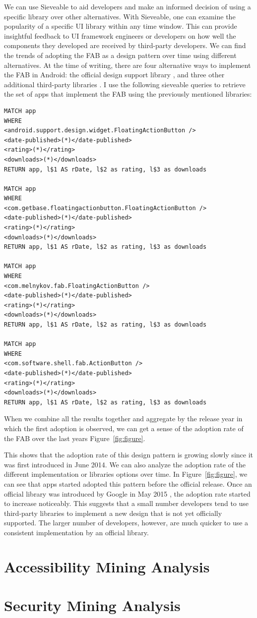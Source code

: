 We can use Sieveable to aid developers and make an informed decision of using a specific library over other alternatives.
With Sieveable, one can examine the popularity of a specific UI library within any time window.
This can provide insightful feedback to UI framework engineers or developers on how well the components they developed are received by third-party developers.
We can find the trends of adopting the FAB as a design pattern over time using different alternatives.
At the time of writing, there are four alternative ways to implement the FAB in Android: the official design support library \cite{Android_Design_Support_Lib}, and three other additional third-party libraries \cite{android-floating-action-button, FloatingActionButton, fab}.
I use the following sieveable queries to retrieve the set of apps that implement the FAB using the previously mentioned libraries: 

\begin{verbatim}
MATCH app
WHERE
<android.support.design.widget.FloatingActionButton />
<date-published>(*)</date-published>
<rating>(*)</rating>
<downloads>(*)</downloads>
RETURN app, l$1 AS rDate, l$2 as rating, l$3 as downloads

MATCH app
WHERE
<com.getbase.floatingactionbutton.FloatingActionButton />
<date-published>(*)</date-published>
<rating>(*)</rating>
<downloads>(*)</downloads>
RETURN app, l$1 AS rDate, l$2 as rating, l$3 as downloads

MATCH app
WHERE
<com.melnykov.fab.FloatingActionButton />
<date-published>(*)</date-published>
<rating>(*)</rating>
<downloads>(*)</downloads>
RETURN app, l$1 AS rDate, l$2 as rating, l$3 as downloads

MATCH app
WHERE
<com.software.shell.fab.ActionButton />
<date-published>(*)</date-published>
<rating>(*)</rating>
<downloads>(*)</downloads>
RETURN app, l$1 AS rDate, l$2 as rating, l$3 as downloads
\end{verbatim}


When we combine all the results together and aggregate by the release year in which the first adoption is observed, we can get a sense of the adoption rate of the FAB over the last years Figure~\ref{fig:figure}.

This shows that the adoption rate of this design pattern is growing slowly since it was first introduced in June 2014.
We can also analyze the adoption rate of the different implementation or libraries options over time.
In Figure~\ref{fig:figure}, we can see that apps started adopted this pattern before the official release.
Once an official library was introduced by Google in May 2015 \cite{}, the adoption rate started to increase noticeably.
This suggests that a small number developers tend to use third-party libraries to implement a new design that is not yet officially supported.
The larger number of developers, however, are much quicker to use a consistent implementation by an official library.

\section{Accessibility Mining Analysis}

\section{Security Mining Analysis}
